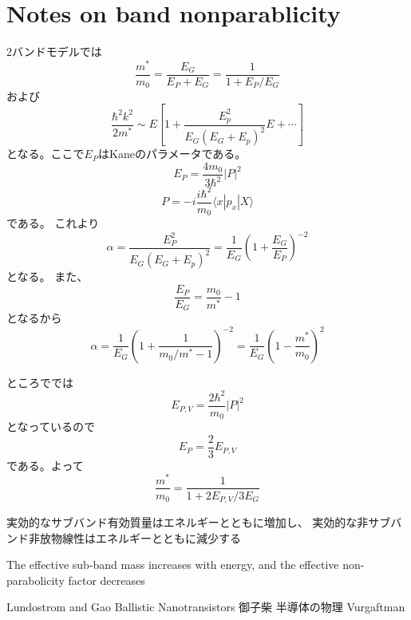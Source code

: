 \documentclass[11pt,uplatex,a4paper]{jsarticle}
\begin{document}
\section{Notes on band nonparablicity}
2バンドモデルでは\cite{mikoshiba}
\begin{equation}
 \frac{m^*}{m_0} = \frac{E_G}{E_P+E_G} = \frac{1}{1+E_P/E_G}
\end{equation}
および
\begin{equation}
 \frac{\hbar^2k^2}{2m^*} \sim
  E \left[ 1 + \frac{E_p^2}{E_G(E_G+E_p)^2}E + \cdots
	\right]
\end{equation}
となる。ここで$E_P$はKaneのパラメータである。
\begin{equation}
 E_P = \frac{4 m_0}{3 \hbar^2}|P|^2
\end{equation}
\begin{equation}
 P=-i\frac{i\hbar^2}{m_0}\langle x | p_x| X\rangle
\end{equation}
である。
これより
\begin{equation}
 \alpha = \frac{E_P^2}{E_G(E_G+E_p)^2} = \frac{1}{E_G}(1+\frac{E_G}{E_P})^{-2}
\end{equation}
となる。
また、
\begin{equation}
 \frac{E_P}{E_G} = \frac{m_0}{m^*}-1
\end{equation}
となるから
\begin{equation}
 \alpha = \frac{1}{E_G} (1+\frac{1}{m_0/m^*-1})^{-2}
  = \frac{1}{E_G} (1-\frac{m^*}{m_0})^2
\end{equation}

ところで\cite{Vurgaftman}では
\begin{equation}
 E_{P,V}=\frac{2\hbar^2}{m_0}|P|^2
\end{equation}
となっているので
\begin{equation}
 E_P =\frac{2}{3}E_{P,V}
\end{equation}
である。よって
\begin{equation}
 \frac{m^*}{m_0} =  \frac{1}{1+2E_{P,V}/3E_G}
\end{equation}

実効的なサブバンド有効質量はエネルギーとともに増加し、
実効的な非サブバンド非放物線性はエネルギーとともに減少する

The effective sub-band mass increases with energy, and the effective non-parabolicity factor decreases



 \begin{thebibliography}{99}
   Lundostrom and Gao Ballistic Nanotransistors
  御子柴 半導体の物理
  Vurgaftman
 \end{thebibliography}
\end{document}
